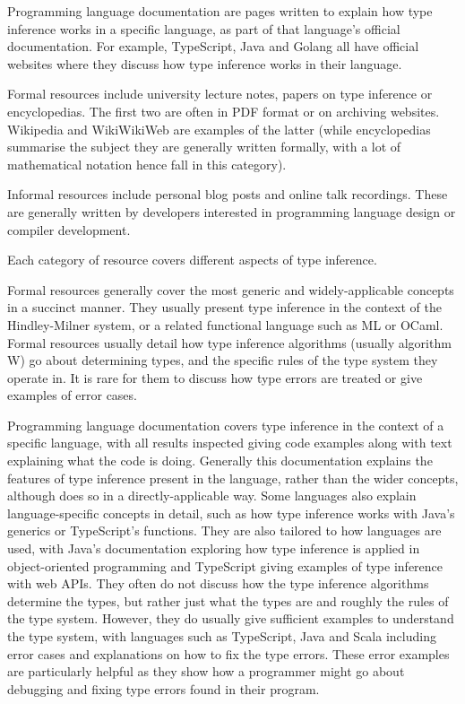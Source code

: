 \documentclass[a4paper,fleqn,oneside,12pt]{report}
\begin{document}
Programming language documentation are pages written to explain how type inference works in a specific language, as part of that language’s official documentation. For example, TypeScript, Java and Golang all have official websites where they discuss how type inference works in their language.

Formal resources include university lecture notes, papers on type inference or encyclopedias. The first two are often in PDF format or on archiving websites. Wikipedia and WikiWikiWeb are examples of the latter (while encyclopedias summarise the subject they are generally written formally, with a lot of mathematical notation hence fall in this category).

Informal resources include personal blog posts and online talk recordings. These are generally written by developers interested in programming language design or compiler development.

Each category of resource covers different aspects of type inference.

Formal resources generally cover the most generic and widely-applicable concepts in a succinct manner. They usually present type inference in the context of the Hindley-Milner system, or a related functional language such as ML or OCaml. Formal resources usually detail how type inference algorithms (usually algorithm W) go about determining types, and the specific rules of the type system they operate in. It is rare for them to discuss how type errors are treated or give examples of error cases.

Programming language documentation covers type inference in the context of a specific language, with all results inspected giving code examples along with text explaining what the code is doing. Generally this documentation explains the features of type inference present in the language, rather than the wider concepts, although does so in a directly-applicable way. Some languages also explain language-specific concepts in detail, such as how type inference works with Java’s generics or TypeScript’s functions. They are also tailored to how languages are used, with Java’s documentation exploring how type inference is applied in object-oriented programming and TypeScript giving examples of type inference with web APIs. They often do not discuss how the type inference algorithms determine the types, but rather just what the types are and roughly the rules of the type system. However, they do usually give sufficient examples to understand the type system, with languages such as TypeScript, Java and Scala including error cases and explanations on how to fix the type errors. These error examples are particularly helpful as they show how a programmer might go about debugging and fixing type errors found in their program.
\end{document}

